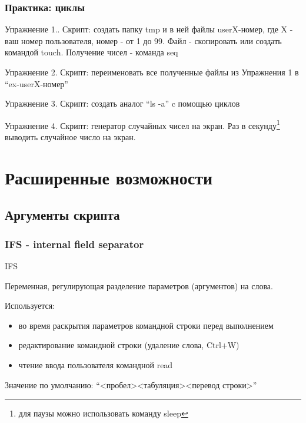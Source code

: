 \begin{frame}
  \frametitle{Практика: циклы}

    \alert{Упражнение 1.}. Скрипт: создать папку tmp и в ней файлы userX-номер, где X - ваш номер пользователя, номер - от 1 до 99. Файл - скопировать или создать командой touch. Получение чисел - команда seq \pause

    \alert{Упражнение 2.} Скрипт: переименовать все полученные файлы из Упражнения 1 в ``ex-userX-номер'' \pause

    \alert{Упражнение 3.} Скрипт: создать аналог ``ls -a'' c помощью циклов \pause

    \alert{Упражнение 4.} Скрипт: генератор случайных чисел на экран. Раз в секунду\footnote{для паузы можно использовать команду sleep} выводить случайное число на экран.
\end{frame}

\section{Расширенные возможности}

\subsection{Аргументы скрипта}
\begin{frame}[fragile]
  \frametitle{IFS - internal field separator}

  \alert{IFS}

  Переменная, регулирующая разделение параметров (аргументов) на слова. 
  
  Используется:
  \begin{itemize}
    \item во время раскрытия параметров командной строки перед выполнением
    \item редактирование командной строки (удаление слова, Ctrl+W)
    \item чтение ввода пользователя командной \alert{read}
  \end{itemize}

  Значение по умолчанию: ``<пробел><табуляция><перевод строки>''


\end{frame}

